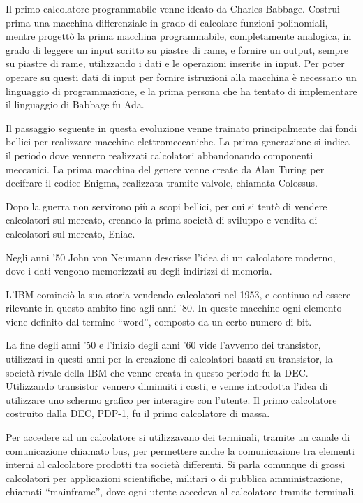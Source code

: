 \documentclass{article}
\numberwithin{equation}{subsection}
\begin{document}
Il primo calcolatore programmabile venne ideato da Charles Babbage. Costruì prima una macchina differenziale in grado di calcolare funzioni polinomiali, mentre progettò la 
prima macchina programmabile, completamente analogica, in grado di leggere un input scritto su piastre di rame, e fornire un output, sempre su piastre di rame, utilizzando 
i dati e le operazioni inserite in input. Per poter operare su questi dati di input per fornire istruzioni alla macchina è necessario un linguaggio di programmazione, e la 
prima persona che ha tentato di implementare il linguaggio di Babbage fu Ada. %


Il passaggio seguente in questa evoluzione venne trainato principalmente dai fondi bellici per realizzare macchine elettromeccaniche. La prima generazione si indica il 
periodo dove vennero realizzati calcolatori abbandonando componenti meccanici. La prima macchina del genere venne create da Alan Turing per decifrare il codice Enigma, 
realizzata tramite valvole, chiamata Colossus. 



Dopo la guerra non servirono più a scopi bellici, per cui si tentò di vendere calcolatori sul mercato, creando la prima società di sviluppo e vendita di calcolatori 
sul mercato, Eniac. 

Negli anni '50 John von Neumann descrisse l'idea di un calcolatore moderno, dove i dati vengono memorizzati su degli indirizzi di memoria. 

L'IBM cominciò la sua storia vendendo calcolatori nel 1953, e continuo ad essere rilevante in questo ambito fino agli anni '80. 
In queste macchine ogni elemento viene definito dal termine ``word'', composto da un certo numero di bit. 


La fine degli anni '50 e l'inizio degli anni '60 vide l'avvento dei transistor, utilizzati in questi anni per la creazione di calcolatori basati su transistor, la società 
rivale della IBM che venne creata in questo periodo fu la DEC. Utilizzando transistor vennero diminuiti i costi, e venne introdotta l'idea di utilizzare uno schermo grafico 
per interagire con l'utente. Il primo calcolatore costruito dalla DEC, PDP-1, fu il primo calcolatore di massa. 

Per accedere ad un calcolatore si utilizzavano dei terminali, tramite un canale di comunicazione chiamato bus, per permettere anche la comunicazione tra elementi interni al 
calcolatore prodotti tra società differenti. 
Si parla comunque di grossi calcolatori per applicazioni scientifiche, militari o di pubblica amministrazione, chiamati ``mainframe'', dove ogni utente accedeva al calcolatore 
tramite terminali. 
\end{document}

